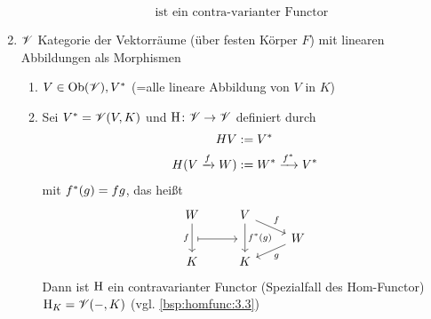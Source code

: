\begin{beispiel}
\begin{enumerate}
\begin{align*}
\begin{matrix}
			\end{matrix} \text{ ist ein contra-varianter Functor}
		\end{align*}
		\item $\mathscr V$ Kategorie der Vektorräume (über festen Körper $F$) mit linearen Abbildungen als Morphismen
		\begin{enumerate}[label=]
			\item $V \in \operatorname{Ob}(\mathscr V), V^{\ast}$  (=alle lineare Abbildung von $V$ in $K$)
			\item Sei $V^{\ast} = \mathscr V(V,K)$ und $\operatorname{H}\colon \mathscr V\to\mathscr V$ definiert
                durch
                \begin{align*}
                    HV &:= V^{\ast} \\
                    H(V\xrightarrow{f} W) &:=
                        W^{\ast}\xrightarrow{f^{\ast}}V^{\ast}
                \end{align*}
                mit $f^{\ast}(g) = fg$, das heißt
                \[
                    \begin{tikzcd}[row sep=tiny]
                        W \arrow[dd, "f"'] & V \arrow[dd, "\astar{f}(g)"] \arrow[dr, "f"] &                   \\
                        \arrow[r,maps to]  & ~                                            & W \arrow[dl, "g"] \\
                        K                  & K                                            &
                    \end{tikzcd}
                \]
			    Dann ist $\operatorname{H}$ ein contravarianter Functor (Spezialfall des Hom-Functor) $\operatorname{H}_{K} = \mathscr V(-,K)$ (vgl. \ref{bsp:homfunc:3.3})
		\end{enumerate}
	\end{enumerate}
\end{beispiel}
